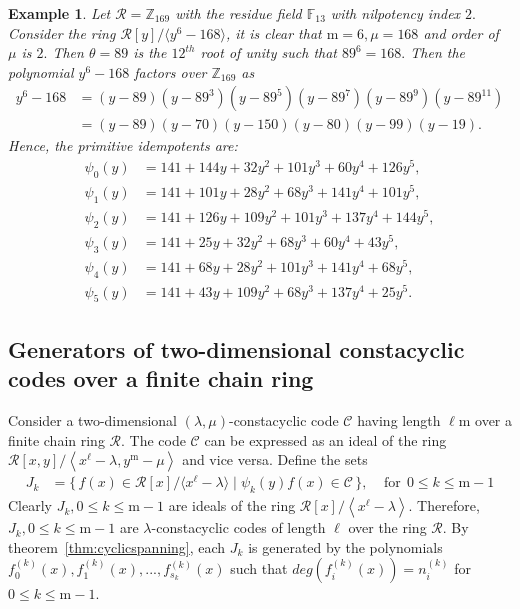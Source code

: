 \documentclass[12pt,a4paper]{article}
\newtheorem{example}{Example}
\begin{document}
\begin{example}\label{ex:fourth}
Let $\mathcal{R}=\mathbb{Z}_{169}$ with the residue field $\mathbb{F}_{13}$ with nilpotency index $2.$ Consider the ring $\mathcal{R}[y]/ \langle y^6-168 \rangle$, it is clear that $\mathrm{m}=6, \mu=168$ and order of $\mu$ is $2.$ Then $\theta= 89$ is the $12^{th}$ root of unity such that $89^6=168.$ Then the polynomial $y^{6}-168$ factors over $\mathbb{Z}_{169}$ as
\[
\begin{aligned}
y^{6}-168
&=(y-89)(y-89^3)(y-89^5)(y-89^7)(y-89^9)(y-89^{11})\\
&=(y-89)(y-70)(y-150)(y-80)(y-99)(y-19).
\end{aligned}
\]
Hence, the primitive idempotents are:
\[
\begin{aligned}
\psi_0(y)&= 141+144y+32y^2+101y^3+60y^4+126y^5,\\
\psi_1(y)&= 141+101y+28y^2+68y^3+141y^4+101y^5,\\
\psi_2(y)&= 141+126y+109y^2+101y^3+137y^4+144y^5,\\
\psi_3(y)&= 141+25y+32y^2+68y^3+60y^4+43y^5,\\
\psi_4(y)&= 141+68y+28y^2+101y^3+141y^4+68y^5,\\
\psi_5(y)&= 141+43y+109y^2+68y^3+137y^4+25y^5.
\end{aligned}
\]
\end{example}

\subsection{Generators of two-dimensional constacyclic codes over a finite chain ring}
Consider a two-dimensional $(\lambda,\mu)$-constacyclic code $\mathscr{C}$ having length $\ell\mathrm{m}$ over a finite chain ring $\mathcal{R}$. The code $\mathscr{C}$ can be expressed as an ideal of the ring $\mathcal{R}[x,y]/ \left\langle x^{\ell} - \lambda,y^{\mathrm{m}} - \mu \right\rangle$ and vice versa. Define the sets
\[
\begin{aligned}
J_k &= \{\, f(x) \in \mathcal{R}[x]/\langle x^{\ell} - \lambda\rangle \; | \; \psi_k(y)f(x) \in \mathscr{C} \,\},~~~~~ \text{for} ~~ 0 \le k \le \mathrm{m}-1
\end{aligned}
\]
Clearly $J_k,0 \le k \le \mathrm{m}-1$ are ideals of the ring $\mathcal{R}[x]/\left\langle x^{\ell}-\lambda\right\rangle$. Therefore, $J_k,0 \le k \le \mathrm{m}-1$ are $\lambda$-constacyclic codes of length $\ell$ over the ring $\mathcal{R}$.  By theorem~\ref{thm:cyclicspanning}, each $J_k$ is generated by the polynomials $f_0^{(k)}(x),f_1^{(k)}(x),...,f_{s_{k}}^{(k)}(x)$ such that $deg(f_i^{(k)}(x))=n_i^{(k)}$ for $0 \le k \le \mathrm{m}-1$. 
\end{document}

